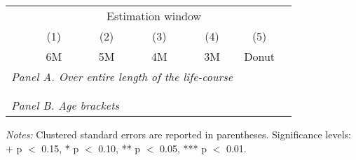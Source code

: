 \vspace*{\fill}
\begin{table}[H] \centering 
 \begin{threeparttable} \centering %
  {\def\sym#1{\ifmmode^{#1}\else\(^{#1}\)\fi} 
 	\begin{tabular}{l*{6}{c}}
 		\toprule 
 		& \multicolumn{5}{c}{Estimation window} \\ 
 		\cmidrule(lr){2-6}
 		&\multicolumn{1}{c}{(1)}&\multicolumn{1}{c}{(2)}&\multicolumn{1}{c}{(3)}&\multicolumn{1}{c}{(4)}&\multicolumn{1}{c}{(5)}\\
 		&\multicolumn{1}{c}{6M}&\multicolumn{1}{c}{5M}&\multicolumn{1}{c}{4M}&\multicolumn{1}{c}{3M}&\multicolumn{1}{c}{Donut}\\
 		\midrule
 		\multicolumn{5}{l}{\emph{Panel A. Over entire length of the life-course}} \\
 		 \\ \\
 		\multicolumn{5}{l}{\emph{Panel B. Age brackets}} \\
 		    
 		\bottomrule 
 	\end{tabular}}
 	\begin{tablenotes} 
 		\item \tiny \emph{Notes:} Clustered standard errors are reported in parentheses. \newline Significance levels: $+$ p $<$ 0.15, * p $<$ 0.10, ** p $<$ 0.05, *** p $<$ 0.01.
 	\end{tablenotes} 
 \end{threeparttable} 
 \end{table}
\vspace*{\fill}\clearpage 